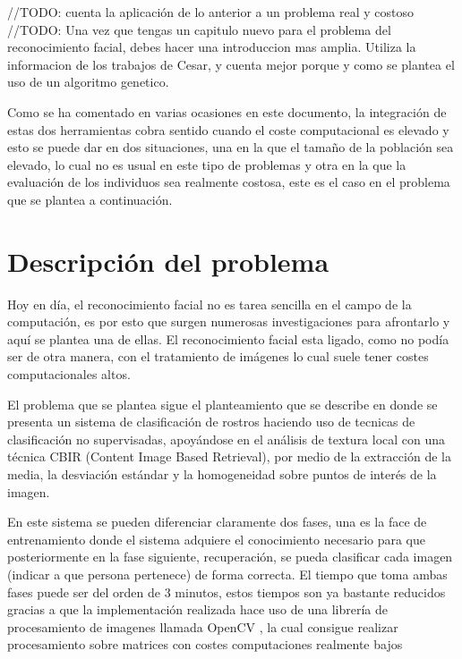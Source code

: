 //TODO: cuenta la aplicación de lo anterior a un problema real y costoso
//TODO: Una vez que tengas un capitulo nuevo para el problema del reconocimiento facial, debes hacer una introduccion mas amplia. Utiliza la informacion de los trabajos de Cesar, y cuenta mejor porque y como se plantea el uso de un algoritmo genetico.

Como se ha comentado en varias ocasiones en este documento, la integración de estas dos herramientas cobra sentido cuando el coste computacional es elevado y esto se puede dar en dos situaciones, una en la que el tama\~no de la población sea elevado, lo cual no es usual en este tipo de problemas y otra en la que la evaluación de los individuos sea realmente costosa, este es el caso en el problema que se plantea a continuación.

\section{Descripci\'on del problema}

Hoy en d\'ia, el reconocimiento facial no es tarea sencilla en el campo de la computación, es por esto que surgen numerosas investigaciones para afrontarlo y aquí se plantea una de ellas. El reconocimiento facial esta ligado, como no podía ser de otra manera, con el tratamiento de imágenes lo cual suele tener costes computacionales altos.

El problema que se plantea sigue el planteamiento que se describe en \cite{paper-facerecognition} donde se presenta un sistema de clasificación de rostros haciendo uso de tecnicas de clasificaci\'on no supervisadas, apoy\'andose en el an\'alisis de textura local con una t\'ecnica CBIR (Content Image Based Retrieval), por medio de la extracci\'on de la media, la desviaci\'on est\'andar y la homogeneidad sobre puntos de inter\'es de la imagen.


En este sistema se pueden diferenciar claramente dos fases, una es la face de entrenamiento  donde el sistema adquiere el conocimiento necesario para que posteriormente en la fase siguiente, recuperación, se pueda clasificar cada imagen (indicar a que persona pertenece) de forma correcta. El tiempo que toma ambas fases puede ser del orden de 3 minutos, estos tiempos son ya bastante reducidos gracias a que la implementaci\'on realizada hace uso de una librería de procesamiento de imagenes llamada OpenCV \cite{opencv}, la cual consigue realizar procesamiento sobre matrices con costes computaciones realmente bajos